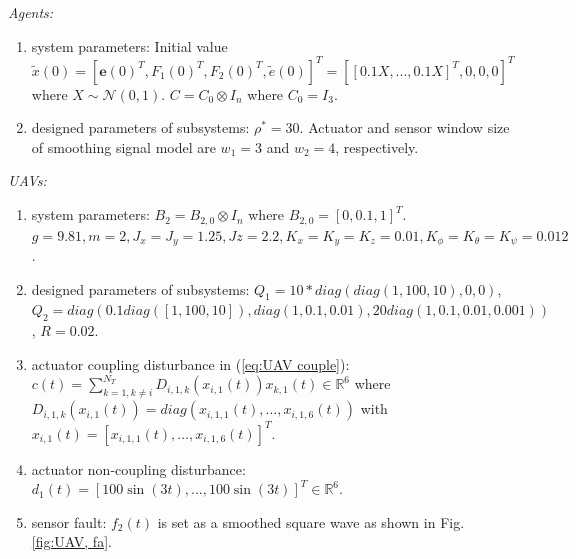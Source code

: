 \documentclass{ieeeaccess}
\begin{document}
\textit{Agents:}\begin{enumerate}
    \item system parameters:
    Initial value $\tilde{x}(0) = [\pmb{e}(0)^T, F_1(0)^T\mathbin{,} F_2(0)^T, \tilde{e}(0)]^T = [[0.1X, ..., 0.1X]^T, 0, 0, 0]^T$ where $X \sim \mathcal{N}(0, 1)$. $C = C_0 \otimes I_n$ where $C_0 = I_3$.
    \item designed parameters of subsystems: $\rho^*=30$. Actuator and sensor window size of smoothing signal model are $w_1=3$ and $w_2=4$, respectively.
\end{enumerate}

\textit{UAVs:}\begin{enumerate}
    \item system parameters:
    $B_2=B_{2,0}\otimes I_n$ where $B_{2,0} = [0, 0.1, 1]^T$.
    $g = 9.81, m = 2,
    J_x = J_y = 1.25, Jz = 2.2,
    K_x = K_y = K_z = 0.01,
    K_\phi = K_\theta = K_\psi = 0.012$.

    \item designed parameters of subsystems: 
    $Q_1 = 10*diag(diag(1\mathbin{,} 100\mathbin{,} 10)\mathbin{,} 0\mathbin{,} 0)$, 
    $Q_2 = diag(0.1diag([1\mathbin{,} 100\mathbin{,} 10])\mathbin{,} diag(1,0.1, 0.01)\mathbin{,} 20diag(1, 0.1, 0.01\mathbin{,} 0.001))$, 
    $R = 0.02$.

    \item actuator coupling disturbance in (\ref{eq:UAV couple}):
    \\$c(t) = \sum_{k = 1, k \neq i}^{N_T}D_{i, 1, k}(x_{i, 1}(t))x_{k, 1}(t)\in\mathbb{R}^6$ where $D_{i, 1, k}(x_{i, 1}(t)) = diag(x_{i, 1, 1}(t)\mathbin{,}\dots\mathbin{,}x_{i, 1, 6}(t))$ with $x_{i, 1}(t) = [x_{i, 1, 1}(t)\mathbin{,}\dots\mathbin{,}x_{i, 1, 6}(t)]^T$.
    \item actuator non-coupling disturbance:
    \\ $d_1(t) = [100\sin(3t)\mathbin{,} ...\mathbin{,} 100\sin(3t)]^T\in\mathbb{R}^6$.
    \item sensor fault: $f_2(t)$ is set as a smoothed square wave as shown in Fig. \ref{fig:UAV, fa}.
\end{enumerate}
\end{document}
